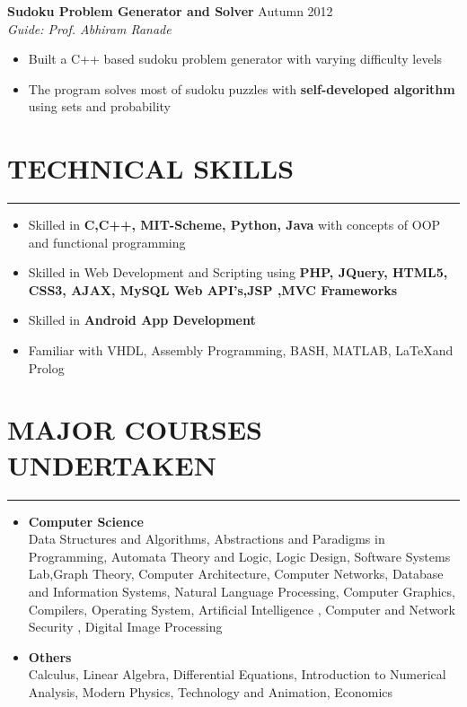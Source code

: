 \documentclass[11pt]{article} %
\begin{document}
\noindent \textbf{Sudoku Problem Generator and Solver} \hfill Autumn 2012 \vspace{-0.5mm}\\
\textit{Guide: Prof. Abhiram Ranade}
\vspace{-4mm}
\begin{itemize}
\itemsep-0.4em
\item Built a C++ based sudoku problem generator with varying difficulty levels
\item The program solves most of sudoku puzzles with \textbf{self-developed algorithm} using sets and probability
\end{itemize}







\vspace{-8mm}
\section*{TECHNICAL SKILLS}
\vspace{-3mm}
\hrule
\medskip
\begin{itemize}
\itemsep-0.4em
\item Skilled in \textbf{C,C++, MIT-Scheme, Python, Java} with concepts of OOP and functional programming
\item Skilled in Web Development and Scripting using \textbf{PHP, JQuery,  HTML5, CSS3, AJAX, MySQL Web API’s,JSP ,MVC Frameworks}
\item Skilled in \textbf{Android App Development}
\item Familiar with {VHDL, Assembly Programming, BASH, MATLAB,  \LaTeX  and Prolog}
\end{itemize}
\vspace{-8mm}

\section*{MAJOR COURSES UNDERTAKEN}
\vspace{-3mm}
\hrule
\medskip
\begin{itemize}
\itemsep -0.4em
\item
{\bf Computer Science}\\
Data Structures and Algorithms, Abstractions and Paradigms in Programming, Automata Theory and Logic, Logic Design, Software Systems Lab,Graph Theory, Computer Architecture, Computer Networks, Database and Information Systems, Natural Language Processing, Computer Graphics, Compilers, Operating
System, Artificial Intelligence , Computer and Network Security , Digital Image Processing

\item
{\bf Others}\\
Calculus, Linear Algebra, Differential Equations, Introduction to Numerical Analysis, Modern Physics, Technology and Animation, Economics\\
\end{itemize}
\vspace{-9mm}
\vspace{-3mm}
\end{document}

